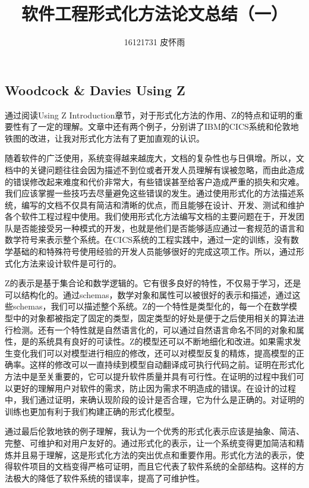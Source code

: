 \documentclass{article}
\author{16121731 皮怀雨}
\title{软件工程形式化方法论文总结（一）}
\begin{document}
\begin{CJK}{UTF8}{gbsn}
\maketitle
\begin{spacing}{1.4}
\renewcommand{\CJKglue}{\hskip 0.5pt}
\section{Woodcock \& Davies Using Z}
通过阅读Using Z Introduction章节，对于形式化方法的作用、Z的特点和证明的重要性有了一定的理解。文章中还有两个例子，分别讲了IBM的CICS系统和伦敦地铁图的改进，让我对形式化方法有了更加直观的认识。
\par
随着软件的广泛使用，系统变得越来越庞大，文档的复杂性也与日俱增。所以，文档中的关键问题往往会因为描述不到位或者开发人员理解有误被忽略，而由此造成的错误修改起来难度和代价非常大，有些错误甚至给客户造成严重的损失和灾难。我们应该掌握一些技巧去尽量避免这些错误的发生。通过使用形式化的方法描述系统，编写的文档不仅具有简洁和清晰的优点，而且能够在设计、开发、测试和维护各个软件工程过程中使用。我们使用形式化方法编写文档的主要问题在于，开发团队是否能接受另一种模式的开发，也就是他们是否能够适应通过一套规范的语言和数学符号来表示整个系统。在CICS系统的工程实践中，通过一定的训练，没有数学基础的和特殊符号使用经验的开发人员能够很好的完成这项工作。所以，通过形式化方法来设计软件是可行的。
\par
Z的表示是基于集合论和数学逻辑的。它有很多良好的特性，不仅易于学习，还是可以结构化的。通过schemas，数学对象和属性可以被很好的表示和描述，通过这些schemas，我们可以描述整个系统。Z的一个特性是类型化的，每一个在数学模型中的对象都被指定了固定的类型，固定类型的好处是便于之后使用相关的算法进行检测。还有一个特性就是自然语言化的，可以通过自然语言命名不同的对象和属性，是的系统具有良好的可读性。Z的模型还可以不断地细化和改进。如果需求发生变化我们可以对模型进行相应的修改，还可以对模型反复的精炼，提高模型的正确率。这样的修改可以一直持续到模型自动翻译成可执行代码之前。证明在形式化方法中是至关重要的，它可以提升软件质量并具有可行性。在证明的过程中我们可以更好的理解用户对软件的需求，防止因为需求不明造成的错误。在设计的过程中，我们通过证明，来确认现阶段的设计是否合理，它为什么是正确的。对证明的训练也更加有利于我们构建正确的形式化模型。
\par
通过最后伦敦地铁的例子理解，我认为一个优秀的形式化表示应该是抽象、简洁、完整、可维护和对用户友好的。通过形式化的表示，让一个系统变得更加简洁和精炼并且易于理解，这是形式化方法的突出优点和重要作用。形式化方法的表示，使得软件项目的文档变得严格可证明，而且它代表了软件系统的全部结构。这样的方法极大的降低了软件系统的错误率，提高了可维护性。

\end{spacing}
\end{CJK}
\end{document}
